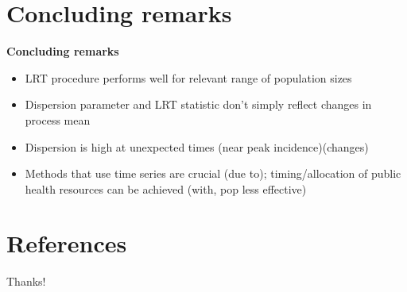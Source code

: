 \documentclass{beamer}
\begin{document}
\section{Concluding remarks}
\begin{frame}{\textbf{Concluding remarks}}
	\begin{itemize}[<+-| alert@+>]
            \item LRT procedure performs well for relevant range of population sizes
            \item Dispersion parameter and LRT statistic don't simply reflect changes in process mean
		\item Dispersion is high at unexpected times (near peak incidence)(changes)
            \item Methods that use time series are crucial (due to); timing/allocation of public health resources can be achieved (with, pop less effective) 
	\end{itemize}
\end{frame}

\section{References}

\begin{frame}
    \printbibliography
\end{frame}

\begin{frame}
	\begin{center}
		{\Huge Thanks!}
	\end{center}
\end{frame}
\end{document}
